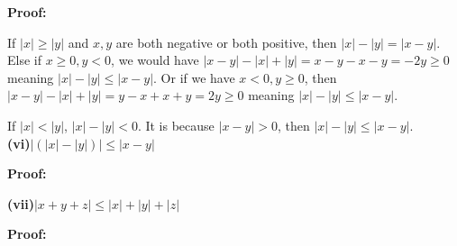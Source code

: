 \documentclass[a4paper,12pt]{report}
\begin{document}
\noindent
\textbf{Proof: }

\noindent
If $|x|\geq|y|$ and $x,y$ are both negative or both positive, then $ |x|-|y| = |x-y|$. Else if $x\geq 0, y <0$, we would have $|x-y|-|x|+|y|=x-y-x-y=-2y\geq 0$ meaning $ |x|-|y|\leq |x-y|$. Or if we have $x < 0, y \geq0$, then $|x-y|-|x|+|y|=y-x+x+y=2y\geq 0$ meaning $ |x|-|y|\leq |x-y|$.

\noindent
If $|x|<|y|$, $|x|-|y|<0$. It is because $|x-y|>0$, then $ |x|-|y|\leq |x-y|$. \\

\noindent
\textbf{(vi)}$ |(|x|-|y|)|\leq |x-y|$

\noindent
\textbf{Proof: }

\noindent
\textbf{(vii)}$ |x+y+z|\leq |x|+|y|+|z|$

\noindent
\textbf{Proof: }
\end{document}
